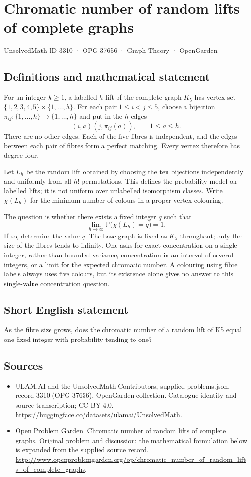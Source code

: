\documentclass[11pt,a4paper]{article}
\begin{document}
\section*{Chromatic number of random lifts of complete graphs}\label{3310}
{\small UnsolvedMath ID 3310 · OPG-37656 · Graph Theory · OpenGarden}
\subsection{Definitions and mathematical statement}
For an integer $h\ge1$, a labelled $h$-lift of the complete graph $K_5$
has vertex set $\{1,2,3,4,5\}\times\{1,\ldots,h\}$. For each pair
$1\le i<j\le5$, choose a bijection
$\pi_{ij}:\{1,\ldots,h\}\to\{1,\ldots,h\}$ and put in the $h$ edges
\[
                       (i,a)(j,\pi_{ij}(a)),\qquad 1\le a\le h.
\]
There are no other edges. Each of the five fibres is independent,
and the edges between each pair of fibres form a perfect matching.
Every vertex therefore has degree four.

Let $L_h$ be the random lift obtained by choosing the ten bijections
independently and uniformly from all $h!$ permutations. This defines
the probability model on labelled lifts; it is not uniform over
unlabelled isomorphism classes. Write $\chi(L_h)$ for the minimum
number of colours in a proper vertex colouring.

The question is whether there exists a fixed integer $q$ such that
\[
                     \lim_{h\to\infty}
                     \mathbb P\bigl(\chi(L_h)=q\bigr)=1.
\]
If so, determine the value $q$. The base graph is fixed as $K_5$
throughout; only the size of the fibres tends to infinity. One asks
for exact concentration on a single integer, rather than bounded
variance, concentration in an interval of several integers, or a
limit for the expected chromatic number. A colouring using fibre
labels always uses five colours, but its existence alone gives no
answer to this single-value concentration question.
\subsection{Short English statement}
As the fibre size grows, does the chromatic number of a random lift of K5 equal one fixed integer with probability tending to one?
\subsection{Sources}
\begin{itemize}
\item[S1] ULAM.AI and the UnsolvedMath Contributors, supplied problems.json, record 3310 (OPG-37656), OpenGarden collection. Catalogue identity and source transcription; CC BY 4.0.
\url{https://huggingface.co/datasets/ulamai/UnsolvedMath}.
\item[S2] Open Problem Garden, Chromatic number of random lifts of complete graphs. Original problem and discussion; the mathematical formulation below is expanded from the supplied source record.
\url{http://www.openproblemgarden.org/op/chromatic_number_of_random_lifts_of_complete_graphs}.
\end{itemize}
\end{document}
